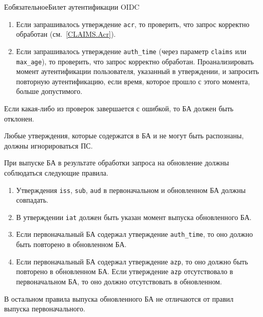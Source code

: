 \begin{appendix}{Е}{обязательное}{Билет аутентификации OIDC}
\begin{enumerate}
\item Если запрашивалось утверждение \lstinline{acr}, то проверить,
что запрос корректно обработан (см.~\ref{CLAIMS.Acr}). 

\item Если запрашивалось утверждение \lstinline{auth_time} 
(через параметр \lstinline{claims} или \lstinline{max_age}), 
то проверить, что запрос корректно обработан.
%
Проанализировать момент аутентификации пользователя,
указанный в утверждении, и запросить повторную аутентификацию, 
если время, которое прошло с этого момента, больше допустимого.
\end{enumerate}

Если какая-либо из проверок завершается с ошибкой, то БА должен быть отклонен.

Любые утверждения, которые содержатся в БА
и не могут быть распознаны, должны игнорироваться ПС.
 
\label{IDTOKEN.Refresh}

При выпуске БА в результате обработки запроса на обновление должны соблюдаться 
следующие правила.

\begin{enumerate}
\item
Утверждения \lstinline{iss}, \lstinline{sub}, \lstinline{aud}
в первоначальном и обновленном БА должны совпадать.

\item
В утверждении \lstinline{iat} должен быть указан момент выпуска обновленного БА. 

\item
Если первоначальный БА содержал утверждение \lstinline{auth_time}, то оно
должно быть повторено в обновленном БА.

\item
Если первоначальный БА содержал утверждение \lstinline{azp}, то оно
должно быть повторено в обновленном БА.
%
Если утверждение \lstinline{azp} отсутствовало в первоначальном БА, то оно 
должно отсутствовать в обновленном.
\end{enumerate}

В остальном правила выпуска обновленного БА не отличаются от правил выпуска 
первоначального.

\end{appendix}

